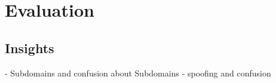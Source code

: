 



\chapter{Evaluation}

\section{Insights}
- Subdomains and confusion about Subdomains
- spoofing and confusion
